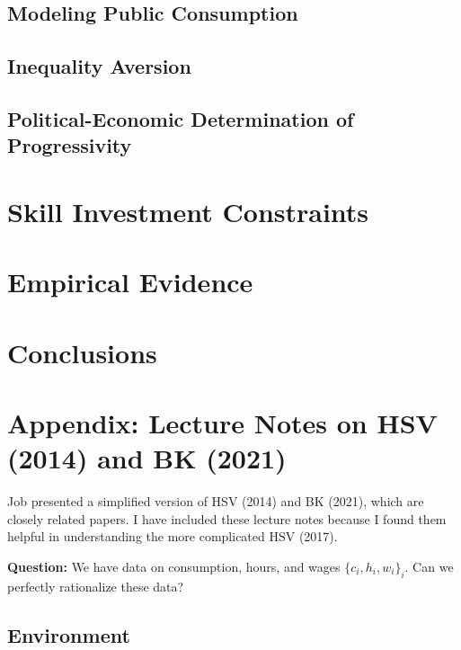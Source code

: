 \documentclass{article}
\begin{document}
\subsection{Modeling Public Consumption}

\subsection{Inequality Aversion}

\subsection{Political-Economic Determination of Progressivity}

\section{Skill Investment Constraints}

\section{Empirical Evidence}

\section{Conclusions}

\pagebreak

\section*{Appendix: Lecture Notes on HSV (2014) and BK (2021)}

Job presented a simplified version of HSV (2014) and BK (2021), which are closely related papers. I have included these lecture notes because I found them helpful in understanding the more complicated HSV (2017). 

\bigskip

\textbf{Question:} We have data on consumption, hours, and wages $\{c_i, h_i, w_i\}_i$. Can we perfectly rationalize these data?

\subsection*{Environment}
\end{document}

